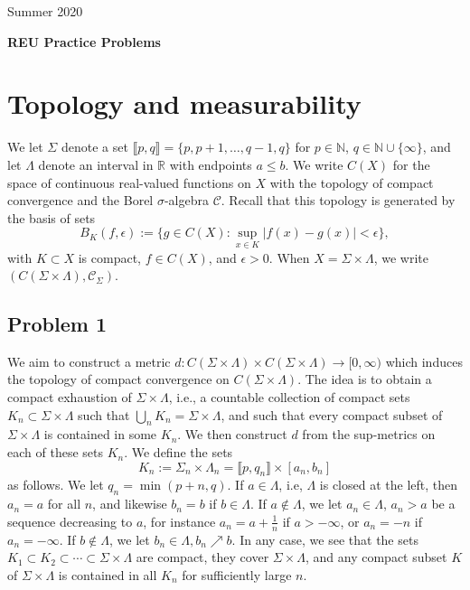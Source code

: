\documentclass[12pt]{article}
\begin{document}
	\begin{flushright}
		Summer 2020
	\end{flushright}
	
	\begin{center}
		\LARGE\textbf{REU Practice Problems}
	\end{center}


\section{Topology and measurability}

	We let $\Sigma$ denote a set $\llbracket p, q\rrbracket = \{p,p+1,\dots,q-1,q\}$ for $p\in\mathbb{N}$, $q\in\mathbb{N}\cup\{\infty\}$, and let $\Lambda$ denote an interval in $\mathbb{R}$ with endpoints $a\leq b$. We write $C(X)$ for the space of continuous real-valued functions on $X$ with the topology of compact convergence and the Borel $\sigma$-algebra $\mathcal{C}$. Recall that this topology is generated by the basis of sets
	\[
	B_K(f,\epsilon) := \big\{g\in C(X):\sup_{x\in K} |f(x)-g(x)|<\epsilon\big\},
	\]
	with $K\subset X$ is compact, $f\in C(X)$, and $\epsilon>0$. When $X=\Sigma\times\Lambda$, we write $(C(\Sigma\times\Lambda),\mathcal{C}_\Sigma)$.

	\subsection*{Problem 1}
	
		We aim to construct a metric $d:C(\Sigma\times\Lambda)\times C(\Sigma\times\Lambda)\to [0,\infty)$ which induces the topology of compact convergence on $C(\Sigma\times\Lambda)$. The idea is to obtain a compact exhaustion of $\Sigma\times\Lambda$, i.e., a countable collection of compact sets $K_n\subset\Sigma\times\Lambda$ such that $\bigcup_n K_n = \Sigma\times\Lambda$, and such that every compact subset of $\Sigma\times\Lambda$ is contained in some $K_n$. We then construct $d$ from the sup-metrics on each of these sets $K_n$. We define the sets
		\[
		K_n := \Sigma_n \times \Lambda_n = \llbracket p, q_n\rrbracket \times [a_n,b_n]
		\]
		as follows. We let $q_n = \min(p+n,q)$. If $a\in\Lambda$, i.e, $\Lambda$ is closed at the left, then $a_n=a$ for all $n$, and likewise $b_n=b$ if $b\in\Lambda$. If $a\notin\Lambda$, we let $a_n\in\Lambda$, $a_n>a$ be a sequence decreasing to $a$, for instance $a_n=a+\frac{1}{n}$ if $a>-\infty$, or $a_n=-n$ if $a_n=-\infty$. If $b\notin\Lambda$, we let $b_n\in\Lambda, b_n\nearrow b$. In any case, we see that the sets $K_1\subset K_2\subset\cdots\subset\Sigma\times\Lambda$ are compact, they cover $\Sigma\times\Lambda$, and any compact subset $K$ of $\Sigma\times\Lambda$ is contained in all $K_n$ for sufficiently large $n$.
		
\end{document}
